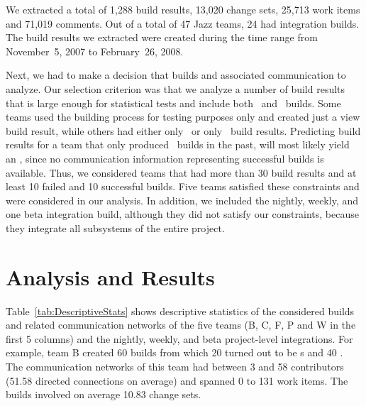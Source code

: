 We extracted a total of 1,288 build results, 13,020 change sets, 25,713 work items
and 71,019 comments. Out of a total of 47 Jazz teams, 24 had integration builds.
The build results we extracted were created during the time range from
November~5, 2007 to February~26, 2008.

Next, we had to make a decision that builds and associated communication to
analyze. Our selection criterion was that we analyze a number of build results
that is large enough for statistical tests and include both \ok\ and \error\
builds. Some teams used the building process for testing purposes only and created
just a view build result, while others had either only \ok\ or only \error\
build results. Predicting build results for a team that only produced \error\
builds in the past, will most likely yield an \error, since no communication
information representing successful builds is available. Thus, we considered
teams that had more than 30 build results and at least 10 failed and 10
successful builds. Five teams satisfied these constraints and were considered in
our analysis. In addition, we included the nightly, weekly, and one beta
integration build, although they did not satisfy our constraints, because 
they integrate all subsystems of the entire project.






\section{Analysis and Results}
\label{sec:AnalysisResults}
Table~\ref{tab:DescriptiveStats} shows descriptive statistics of the considered
builds and related communication networks of the five teams (B, C, F, P and W in
the first 5 columns) and the nightly, weekly, and beta project-level
integrations. For example, team B created 60 builds from which 20 turned out to
be \error s and 40 \ok. The communication networks of this team had between 3 and
58 contributors (51.58 directed connections on average) and spanned 0 to 131 work
items. The builds involved on average 10.83 change sets.

